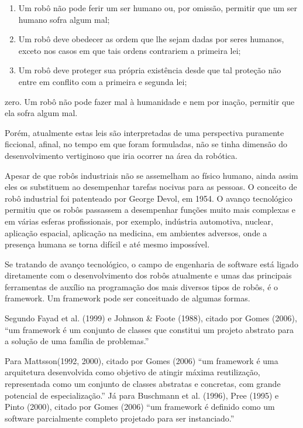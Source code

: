 \begin{enumerate}
	\item Um robô não pode ferir um ser humano ou, por omissão, permitir que um ser humano sofra algum mal;
	\item Um robô deve obedecer as ordem que lhe sejam dadas por seres humanos, exceto nos casos em que tais ordens contrariem a primeira lei;
	\item Um robô deve proteger sua própria existência desde que tal proteção não entre em conflito com a primeira e segunda lei;
\end{enumerate}

zero.     Um robô não pode fazer mal à humanidade e nem por inação, permitir que ela sofra algum mal.

Porém, atualmente estas leis são interpretadas de uma perspectiva puramente ficcional, afinal, no tempo em que foram formuladas, não se tinha dimensão do desenvolvimento vertiginoso que iria ocorrer na área da robótica.

Apesar de que robôs industriais não se assemelham ao físico humano, ainda assim eles os substituem ao desempenhar tarefas nocivas para as pessoas. O conceito de robô industrial foi patenteado por George Devol, em 1954. O avanço tecnológico permitiu que os robôs passassem a desempenhar funções muito mais complexas e em várias esferas profissionais, por exemplo, indústria automotiva, nuclear, aplicação espacial, aplicação na medicina, em  ambientes adversos, onde a presença humana se torna difícil e até mesmo impossível.

Se tratando de avanço tecnológico, o campo de engenharia de software está ligado diretamente com o desenvolvimento dos robôs atualmente e umas das principais ferramentas de auxílio na programação dos mais diversos tipos de robôs, é o framework. Um framework pode ser conceituado de algumas formas.

Segundo Fayad et al. (1999) e Johnson \& Foote (1988), citado por Gomes (2006), “um framework é um conjunto de classes que constitui um projeto abstrato para a solução de uma família de problemas.”

Para Mattsson(1992, 2000), citado por Gomes (2006) “um framework é uma arquitetura desenvolvida como objetivo de atingir máxima reutilização, representada como um conjunto de classes abstratas e concretas, com grande potencial de especialização.”
Já para Buschmann et al. (1996), Pree (1995) e Pinto (2000), citado por Gomes (2006) “um framework é definido como um software parcialmente completo projetado para ser instanciado.”

